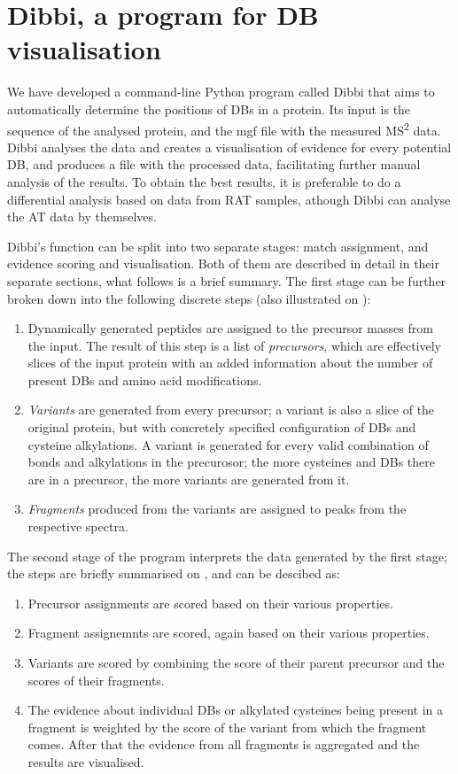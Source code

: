 \section{Dibbi, a program for DB visualisation}

We have developed a command-line Python program called Dibbi that aims to automatically determine the positions of DBs in a protein. Its input is the sequence of the analysed protein, and the mgf file with the measured MS\textsuperscript{2} data. Dibbi analyses the data and creates a visualisation of evidence for every potential DB, and produces a file with the processed data, facilitating further manual analysis of the results. To obtain the best results, it is preferable to do a differential analysis based on data from RAT samples, athough Dibbi can analyse the AT data by themselves.

Dibbi's function can be split into two separate stages: match assignment, and evidence scoring and visualisation. Both of them are described in detail in their separate sections, what follows is a brief summary. The first stage can be further broken down into the following discrete steps (also illustrated on ):

\begin{enumerate}
	\item Dynamically generated peptides are assigned to the precursor masses from the input. The result of this step is a list of \emph{precursors}, which are effectively slices of the input protein with an added information about the number of present DBs and amino acid modifications.
	\item \emph{Variants} are generated from every precursor; a variant is also a slice of the original protein, but with concretely specified configuration of DBs and cysteine alkylations. A variant is generated for every valid combination of bonds and alkylations in the precurosor; the more cysteines and DBs there are in a precursor, the more variants are generated from it.
	\item \emph{Fragments} produced from the variants are assigned to peaks from the respective spectra.
\end{enumerate}

The second stage of the program interprets the data generated by the first stage; the steps are briefly summarised on , and can be descibed as:

\begin{enumerate}
	\item Precursor assignments are scored based on their various properties.
	\item Fragment assignemnts are scored, again based on their various properties.
	\item Variants are scored by combining the score of their parent precursor and the scores of their fragments.
	\item The evidence about individual DBs or alkylated cysteines being present in a fragment is weighted by the score of the variant from which the fragment comes. After that the evidence from all fragments is aggregated and the results are visualised.
\end{enumerate}


